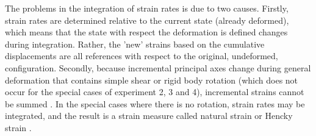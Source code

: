 The problems in the integration of strain rates is due to two causes. Firstly, strain rates are determined relative to the current state (already deformed), which means that the state with respect the deformation is defined changes during integration. Rather, the ’new’ strains based on the cumulative  displacements are all references with respect to the original, undeformed, configuration. Secondly, because incremental principal axes change during general deformation that contains simple shear or rigid body rotation (which does not occur for the special cases of experiment 2, 3 and 4), incremental strains cannot be summed \cite{malvern}. In the special cases where there is no rotation, strain rates may be integrated, and the result is a strain measure called natural strain or Hencky strain \cite{malvern}.




